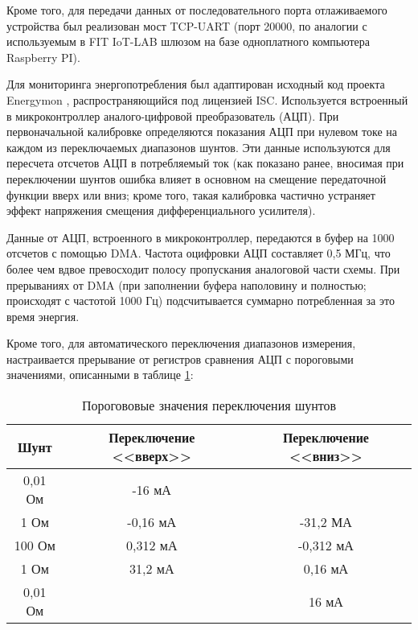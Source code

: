 Кроме того, для передачи данных от последовательного порта отлаживаемого устройства был реализован
мост TCP-UART (порт 20000, по аналогии с используемым в FIT IoT-LAB шлюзом на базе одноплатного 
компьютера Raspberry PI).

Для мониторинга энергопотребления был адаптирован исходный код проекта Energymon \cite{Energymon Code}, 
распространяющийся под лицензией ISC. Используется встроенный в микроконтроллер аналого-цифровой
преобразователь (АЦП). При первоначальной калибровке определяются показания АЦП при нулевом токе на 
каждом из переключаемых диапазонов шунтов. Эти данные используются для пересчета отсчетов АЦП в 
потребляемый ток (как показано ранее, вносимая при переключении шунтов ошибка влияет в основном на 
смещение передаточной функции вверх или вниз; кроме того, такая калибровка частично устраняет эффект
напряжения смещения дифференциального усилителя).

Данные от АЦП, встроенного в микроконтроллер, передаются в буфер на 1000 отсчетов с помощью DMA. 
Частота оцифровки АЦП составляет 0,5 МГц, что более чем вдвое превосходит полосу пропускания 
аналоговой части схемы. При прерываниях от DMA (при заполнении буфера наполовину и полностью; 
происходят с частотой 1000 Гц) подсчитывается суммарно потребленная за это время энергия.

Кроме того, для автоматического переключения диапазонов измерения, настраивается прерывание от 
регистров сравнения АЦП с пороговыми значениями, описанными в таблице \ref{Limits of DAC}:

\begin{table}[H]

    \caption{Порогововые значения переключения шунтов}
    \label{Limits of DAC}   
    \begin{center}
    \begin{tabular}{|c|c|c|}
    \hline
    Шунт & Переключение <<вверх>> & Переключение <<вниз>> \\ \hline
    0,01 Ом & -16 мА &  \\ \hline
    1 Ом  & -0,16 мА & -31,2 МА \\ \hline
    100 Ом & 0,312 мА & -0,312 мА \\ \hline
    1 Ом  & 31,2 мА & 0,16 мА \\ \hline
    0,01 Ом  &  & 16 мА \\ \hline
    \end{tabular}
    \end{center}
\end{table}

